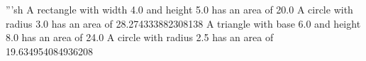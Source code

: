 '''sh
A rectangle with width 4.0 and height 5.0 has an area of 20.0
A circle with radius 3.0 has an area of 28.274333882308138
A triangle with base 6.0 and height 8.0 has an area of 24.0
A circle with radius 2.5 has an area of 19.634954084936208